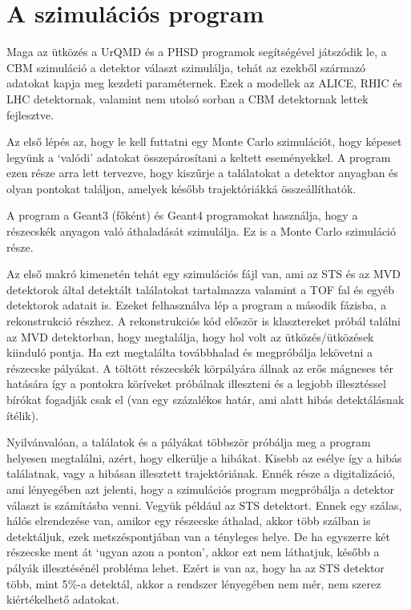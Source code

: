 \documentclass[a4paper,12pt]{article}
\begin{document}
\section{A szimulációs program}
\par Maga az ütközés a UrQMD és a PHSD programok segítségével játszódik le, a CBM szimuláció a detektor választ szimulálja, tehát az ezekből származó adatokat kapja meg kezdeti paraméternek. Ezek a modellek az ALICE, RHIC és LHC detektornak, valamint nem utolsó sorban a
CBM detektornak lettek fejlesztve.
\par Az első lépés az, hogy le kell futtatni egy Monte Carlo szimulációt, hogy képeset legyünk a `valódi' adatokat összepárosítani a keltett eseményekkel. A program ezen része arra lett tervezve, hogy kiszűrje a találatokat a detektor anyagban és olyan pontokat találjon, 
amelyek később trajektóriákká összeállíthatók.
\par A program a Geant3 (főként) és Geant4 programokat használja, hogy a részecskék anyagon való áthaladását szimulálja. Ez is a Monte Carlo szimuláció része.
\par Az első makró kimenetén tehát egy szimulációs fájl van, ami az STS és az MVD detektorok által detektált találatokat tartalmazza valamint a TOF fal és egyéb detektorok adatait is. Ezeket felhasználva lép a program a második fázisba, a rekonstrukció részhez. A rekonstrukciós 
kód először is klasztereket próbál találni az MVD detektorban, hogy megtalálja, hogy hol volt az ütközés/ütközések kiinduló pontja. Ha ezt megtalálta továbbhalad és megpróbálja lekövetni a részecske pályákat. A töltött részecskék körpályára állnak az erős mágneses tér hatására így a pontokra köríveket próbálnak illeszteni és a legjobb illesztéssel bírókat fogadják csak el (van egy százalékos határ, ami alatt hibás detektálásnak ítélik). 
\par Nyilvánvalóan, a találatok és a pályákat többször próbálja meg a program helyesen megtalálni, azért, hogy elkerülje a hibákat. Kisebb az esélye így a hibás találatnak, vagy a hibásan illesztett trajektóriának. Ennék része a digitalizáció, ami lényegében azt jelenti, hogy a szimulációs program megpróbálja a detektor választ is számításba venni. Vegyük például az STS detektort. Ennek egy szálas, hálós elrendezése van, amikor egy részecske áthalad, akkor több szálban is detektáljuk, ezek metszéspontjában van a tényleges helye. De ha egyszerre két részecske ment át `ugyan azon a ponton', akkor ezt nem láthatjuk, később a pályák illesztésénél probléma lehet. Ezért is van az, hogy ha az STS detektor több, mint 5$\%$-a detektál, akkor a rendszer lényegében nem mér, nem szerez kiértékelhető adatokat.
\end{document}
